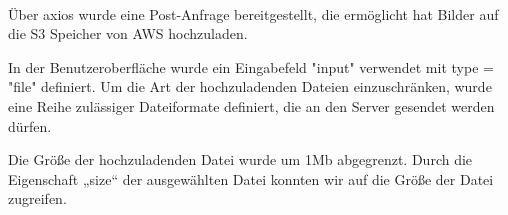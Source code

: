 \paragraph{}
Über axios wurde eine Post-Anfrage bereitgestellt, die ermöglicht hat Bilder auf die S3 Speicher von AWS hochzuladen.

In der Benutzeroberfläche wurde ein Eingabefeld "input" verwendet mit type = "file" definiert. 
Um die Art der hochzuladenden Dateien einzuschränken, wurde eine Reihe zulässiger Dateiformate definiert, die an den Server gesendet werden dürfen.


Die Größe der hochzuladenden Datei wurde um 1Mb abgegrenzt.
Durch die Eigenschaft „size“ der ausgewählten Datei konnten wir auf die Größe der Datei zugreifen.

